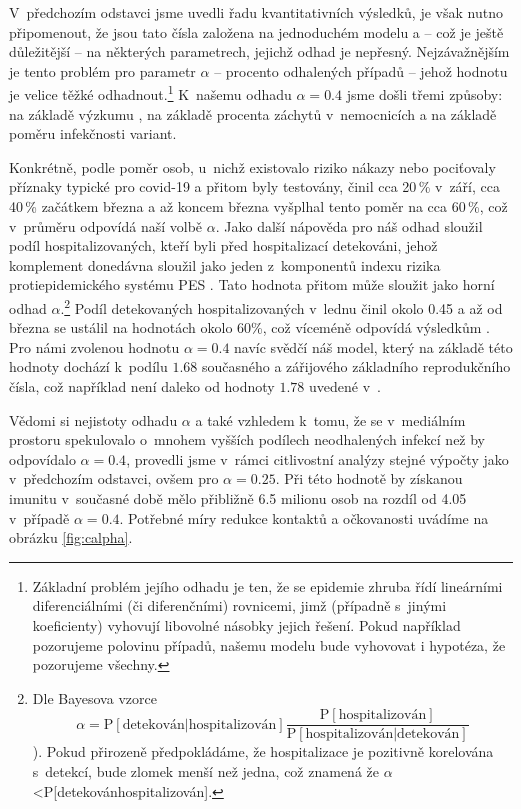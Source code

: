 V~předchozím odstavci jsme uvedli řadu kvantitativních výsledků, je
však nutno připomenout, že jsou tato čísla založena na jednoduchém
modelu a -- což je ještě důležitější -- na některých parametrech,
jejichž odhad je nepřesný. Nejzávažnějším je tento problém pro parametr
$\alpha$ -- procento odhalených případů -- jehož hodnotu je velice
těžké odhadnout.\footnote{Základní problém jejího odhadu je ten, že se epidemie zhruba řídí
lineárními diferenciálními (či diferenčními) rovnicemi, jimž (případně
s~jinými koeficienty) vyhovují libovolné násobky jejich řešení. Pokud
například pozorujeme polovinu případů, našemu modelu bude vyhovovat
i hypotéza, že pozorujeme všechny.} K~našemu odhadu $\alpha=0.4$ jsme došli třemi způsoby: na základě výzkumu
\cite{paqcovid}, na základě procenta záchytů v~nemocnicích a na základě poměru infekčnosti
variant. 

Konkrétně, podle \cite{paqcovid} poměr osob, u~nichž existovalo riziko
nákazy nebo pociťovaly příznaky typické pro covid-19 a přitom byly testovány,
činil cca 20\,\% v~září, cca 40\,\% začátkem března a až koncem března
vyšplhal tento poměr na cca 60\,\%, což v~průměru odpovídá naší volbě $\alpha.$
Jako další nápověda pro náš odhad sloužil podíl hospitalizovaných,
kteří byli před hospitalizací detekováni, jehož komplement donedávna sloužil jako
jeden z~komponentů indexu rizika protiepidemického systému PES \cite{PES}. Tato hodnota přitom může sloužit jako horní odhad $\alpha$.\footnote{Dle Bayesova vzorce 
\[
\alpha=\mathrm{P}[\text{detekován}|\text{hospitalizován}]\frac{\mathrm{P}[\text{hospitalizován}]}{\mathrm{P}[\text{hospitalizován}|\text{detekován}]}
\]
\cite{Pribylova2021Model}). Pokud přirozeně předpokládáme, že hospitalizace
je pozitivně korelována s~detekcí, bude zlomek menší než jedna,
což znamená že $\alpha$\textless P{[}detekován\textbar hospitalizován{]}. } 
Podíl detekovaných hospitalizovaných v~lednu činil okolo 0.45 a až od března se ustálil
na hodnotách okolo 60\%, což víceméně odpovídá výsledkům \cite{paqcovid}. 
Pro námi zvolenou hodnotu $\alpha=0.4$ navíc svědčí náš model, který na základě této hodnoty dochází k~podílu $1.68$ současného a zářijového základního reprodukčního čísla, což například není daleko od hodnoty $1.78$ uvedené v~\cite{curran2021transmission}. 

Vědomi si nejistoty odhadu $\alpha$ a také vzhledem k~tomu, že se v~mediálním prostoru spekulovalo o~mnohem vyšších podílech neodhalených infekcí než by odpovídalo $\alpha=0.4$, provedli
jsme v~rámci citlivostní analýzy stejné výpočty jako v~předchozím
odstavci, ovšem pro $\alpha=0.25$. Při této hodnotě by získanou
imunitu v~současné době mělo přibližně 6.5 milionu osob na rozdíl od 4.05
v~případě $\alpha=0.4$. Potřebné míry redukce kontaktů a očkovanosti uvádíme na obrázku \ref{fig:calpha}.

